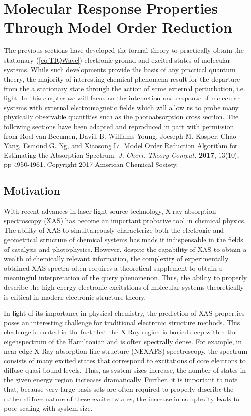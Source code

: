 \chapter{Molecular Response Properties Through Model Order Reduction}
\label{ch:MOR}


The previous sections have developed the formal theory to practically obtain the stationary 
(\cref{eq:TIQWave}) electronic ground and excited states of molecular systems.
While such developments provide the basis of any practical quantum theory, the majority of interesting chemical
phenomena result for the departure from the a stationary state through the action of some external perturbation,
i.e. light. In this chapter we will focus on the interaction and response of molecular systems with external 
electromagnetic fields which will allow us to probe many physically observable quantities such as
the photoabsorption cross section. The following sections have been adapted and reproduced in part with
permission from Roel van Beeumen, David B. Williams-Young, Joeseph M. Kasper, Chao Yang, Esmond G. Ng,
and Xiaosong Li. Model Order Reduction Algorithm for Estimating the Absorption Spectrum. 
\emph{J. Chem. Theory Comput.} \textbf{2017}, 13(10), pp 4950-4961. Copyright 2017 American Chemical
Society.


\section{Motivation}

With recent advances in  laser light source technology, X-ray
absorption spectroscopy (XAS) has become an important probative tool in
chemical physics.\cite{Stohr13_book} The ability of XAS to simultaneously
characterize both the electronic and geometrical structure of chemical systems
has made it indispensable in the fields of catalysis and
photophysics.\cite{Koch87_519,Chasse12_4870,Solomon95_2259,Hodgson00_5775,Hessler01_262}
However, despite the capability of XAS to obtain a wealth of chemically
relevant information, the complexity of experimentally obtained XAS spectra
often requires a theoretical supplement to obtain a meaningful interpretation
of the query phenomenon.\cite{Li16_639,Li16_8752} Thus, the ability to properly
describe the high-energy electronic excitations of molecular systems
theoretically is critical in modern electronic structure theory.

In light of its importance in physical chemistry, the prediction of XAS properties poses an interesting challenge for traditional electronic structure methods. 
This challenge is rooted in the fact that the X-Ray region is buried deep within the eigenspectrum of the Hamiltonian and is often spectrally dense. 
For example, in near edge X-Ray absorption fine structure (NEXAFS) spectroscopy, the spectrum consists of many excited states that correspond to excitations of core electrons to diffuse quasi bound levels. 
Thus, as system sizes increase, the number of states in the given energy region increases dramatically. 
Further, it is important to note that, because very large basis sets are often required to properly describe the rather diffuse nature of these excited states, the increase in complexity leads to poor scaling with system size.

